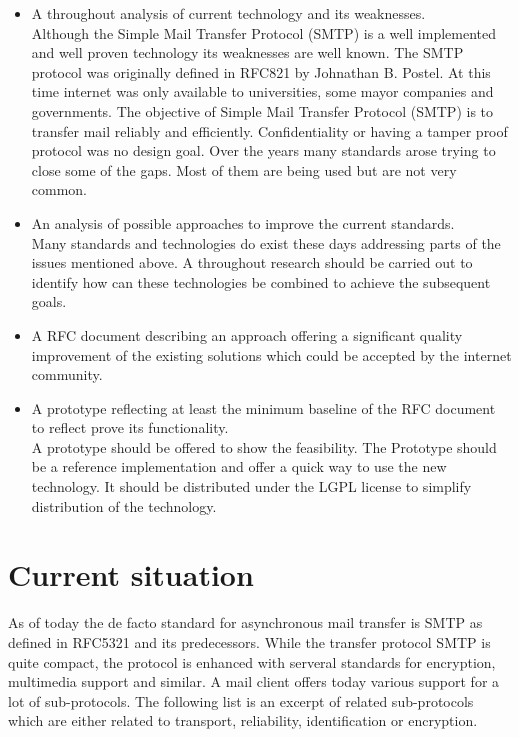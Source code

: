 \documentclass[11pt,a4paper]{book}
\begin{document}
\begin{itemize}
  \item A throughout analysis of current technology and its weaknesses.\\
	      Although the Simple Mail Transfer Protocol (SMTP) is a well implemented and well proven technology its weaknesses are well known. The SMTP protocol was originally defined in RFC821\cite{RFC821} by Johnathan B. Postel. At this time internet was only available to universities, some mayor companies and governments. The objective of Simple Mail Transfer Protocol (SMTP) is to transfer mail reliably and efficiently\cite[p.~1]{RFC821}. Confidentiality or having a tamper proof protocol was no design goal. Over the years many standards arose trying to close some of the gaps. Most of them are being used but are not very common. 
	\item An analysis of possible approaches to improve the current standards.\\
	      Many standards and technologies do exist these days addressing parts of the issues mentioned above. A throughout research should be carried out to identify how can these technologies be combined to achieve the subsequent goals.
	\item A RFC document describing an approach offering a significant quality improvement of the existing solutions which could be accepted by the internet community.
	\item A prototype reflecting at least the minimum baseline of the RFC document to reflect prove its functionality.\\
	      A prototype should be offered to show the feasibility. The Prototype should be a reference implementation and offer a quick way to use the new technology. It should be distributed under the LGPL license to simplify distribution of the technology. 
\end{itemize}

\chapter{Current situation}
As of today the de facto standard for asynchronous mail transfer is SMTP as defined in RFC5321\cite{RFC5321} and its predecessors. While the transfer protocol SMTP is quite compact, the protocol is enhanced with serveral standards for encryption, multimedia support and similar. A mail client offers today various support for a lot of sub-protocols. The following list is an excerpt of related sub-protocols which are either related to transport, reliability, identification or encryption. 
\end{document}
